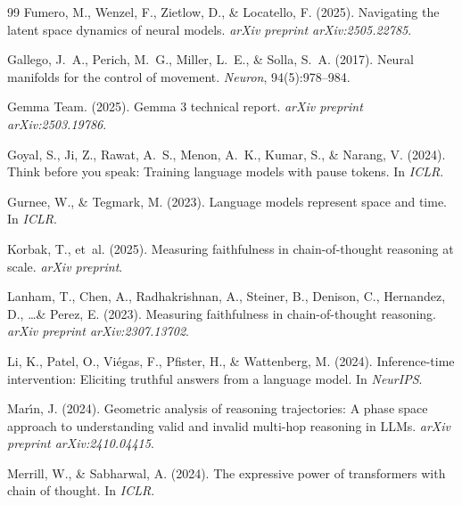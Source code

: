 \documentclass[11pt,twocolumn]{article}
\begin{document}
\begin{thebibliography}{99}
Fumero, M., Wenzel, F., Zietlow, D., \& Locatello, F. (2025).
\newblock Navigating the latent space dynamics of neural models.
\newblock \emph{arXiv preprint arXiv:2505.22785}.

Gallego, J.~A., Perich, M.~G., Miller, L.~E., \& Solla, S.~A. (2017).
\newblock Neural manifolds for the control of movement.
\newblock \emph{Neuron}, 94(5):978--984.

Gemma Team. (2025).
\newblock Gemma 3 technical report.
\newblock \emph{arXiv preprint arXiv:2503.19786}.

Goyal, S., Ji, Z., Rawat, A.~S., Menon, A.~K., Kumar, S., \& Narang, V. (2024).
\newblock Think before you speak: Training language models with pause tokens.
\newblock In \emph{ICLR}.

Gurnee, W., \& Tegmark, M. (2023).
\newblock Language models represent space and time.
\newblock In \emph{ICLR}.

Korbak, T., et~al. (2025).
\newblock Measuring faithfulness in chain-of-thought reasoning at scale.
\newblock \emph{arXiv preprint}.

Lanham, T., Chen, A., Radhakrishnan, A., Steiner, B., Denison, C., Hernandez, D., \ldots \& Perez, E. (2023).
\newblock Measuring faithfulness in chain-of-thought reasoning.
\newblock \emph{arXiv preprint arXiv:2307.13702}.

Li, K., Patel, O., Vi\'{e}gas, F., Pfister, H., \& Wattenberg, M. (2024).
\newblock Inference-time intervention: Eliciting truthful answers from a language model.
\newblock In \emph{NeurIPS}.

Mar\'{\i}n, J. (2024).
\newblock Geometric analysis of reasoning trajectories: A phase space approach to understanding valid and invalid multi-hop reasoning in LLMs.
\newblock \emph{arXiv preprint arXiv:2410.04415}.

Merrill, W., \& Sabharwal, A. (2024).
\newblock The expressive power of transformers with chain of thought.
\newblock In \emph{ICLR}.


\end{thebibliography}
\end{document}
